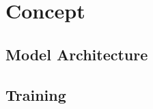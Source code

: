 \chapter{Concept}\label{ch:concept}

\Blindtext


\section{Model Architecture}

\Blindtext


\section{Training}

\Blindtext